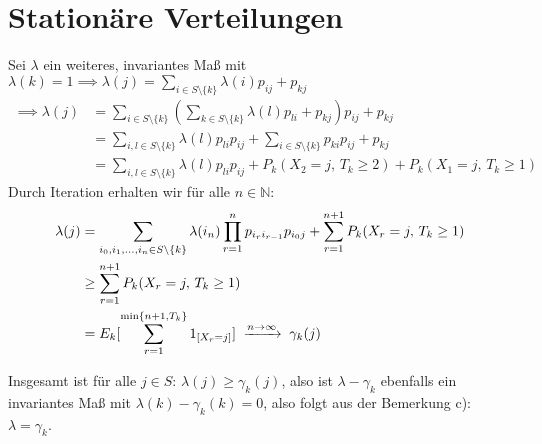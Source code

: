 \documentclass[a4paper,twoside,DIV15,BCOR12mm]{scrbook}
\begin{document}
\section{Stationäre Verteilungen}
\begin{satz}
\label{satz3.1}
\end{satz}


\begin{beweis}
\begin{enuma}
\item %
\item %
\item 
Sei $\lambda$ ein weiteres, invariantes Maß mit $\lambda(k)=1 \implies \lambda(j) =\sum_{i\in S\setminus\{k\}} \lambda(i)p_{ij} + p_{kj}$
\begin{align*}
\implies \lambda(j) &= 
\sum_{i\in S\setminus\{k\}} (\sum_{k\in S\setminus\{k\}} \lambda(l)p_{li} + p_{kj})p_{ij} + p_{kj} \\
&= \sum_{i,l\in S\setminus\{k\}} \lambda(l) p_{li}p_{ij} + \sum_{i\in S\setminus\{k\}} p_{ki}p_{ij} + p_{kj} \\
&= \sum_{i,l\in S\setminus\{k\}} \lambda(l) p_{li}p_{ij} + P_k(X_2 =j,\, T_k\ge 2) + P_k(X_1=j,\, T_k\ge 1)
\end{align*}
Durch Iteration erhalten wir für alle $n\in\mathbb N$:
\begin{align*}
\lambda(j) 
&= \sum_{i_0,i_1,\ldots,i_n\in S\setminus\{k\}} \lambda (i_n) \prod_{r=1}^n p_{i_ri_{r-1}} p_{i_0j} + \sum_{r=1}^{n+1} P_k(X_r=j,\, T_{k} \ge 1) \\
&\ge \sum_{r=1}^{n+1} P_k(X_r=j,\, T_{k} \ge 1) \\
&= E_k[\sum_{r=1}^{\min\{n+1,T_k\}} 1_{[X_r=j]}] \towegen{n\to\infty} \gamma_k(j)
\end{align*}

Insgesamt ist für alle $j\in S$: $\lambda(j) \ge \gamma_k(j)$, also ist $\lambda-\gamma_k$ ebenfalls ein invariantes Maß mit $\lambda(k)-\gamma_k(k)=0$, also folgt aus der Bemerkung c): $\lambda =\gamma_k$.
\end{enuma}

\end{beweis}
\end{document}
